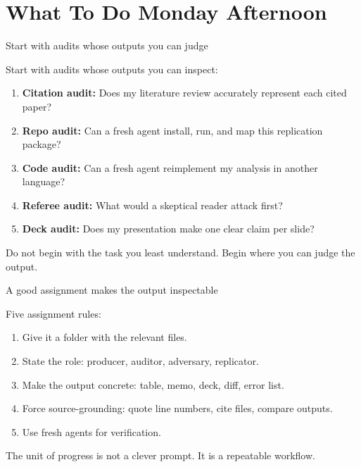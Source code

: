 \documentclass[aspectratio=169,11pt]{beamer}
\begin{document}
\section{What To Do Monday Afternoon}

\begin{frame}{Start with audits whose outputs you can judge}

Start with audits whose outputs you can inspect:

\vspace{0.2cm}

\begin{enumerate}\setlength\itemsep{0.25em}
    \item \textbf{Citation audit:} Does my literature review accurately represent each cited paper?
    \item \textbf{Repo audit:} Can a fresh agent install, run, and map this replication package?
    \item \textbf{Code audit:} Can a fresh agent reimplement my analysis in another language?
    \item \textbf{Referee audit:} What would a skeptical reader attack first?
    \item \textbf{Deck audit:} Does my presentation make one clear claim per slide?
\end{enumerate}

\vspace{0.25cm}

\alert{Do not begin with the task you least understand. Begin where you can judge the output.}

\end{frame}

\begin{frame}{A good assignment makes the output inspectable}

Five assignment rules:

\vspace{0.25cm}

\begin{enumerate}\setlength\itemsep{0.3em}
    \item Give it a folder with the relevant files.
    \item State the role: producer, auditor, adversary, replicator.
    \item Make the output concrete: table, memo, deck, diff, error list.
    \item Force source-grounding: quote line numbers, cite files, compare outputs.
    \item Use fresh agents for verification.
\end{enumerate}

\vspace{0.25cm}

\alert{The unit of progress is not a clever prompt. It is a repeatable workflow.}

\end{frame}
\end{document}
